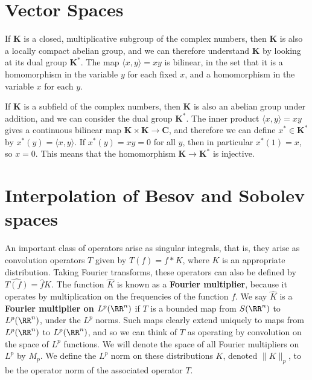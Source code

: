 \chapter{Vector Spaces}

If $\mathbf{K}$ is a closed, multiplicative subgroup of the complex numbers, then $\mathbf{K}$ is also a locally compact abelian group, and we can therefore understand $\mathbf{K}$ by looking at its dual group $\mathbf{K}^*$. The map $\langle x,y \rangle = xy$ is bilinear, in the set that it is a homomorphism in the variable $y$ for each fixed $x$, and a homomorphism in the variable $x$ for each $y$.

If $\mathbf{K}$ is a subfield of the complex numbers, then $\mathbf{K}$ is also an abelian group under addition, and we can consider the dual group $\mathbf{K}^*$. The inner product $\langle x, y \rangle = xy$ gives a continuous bilinear map $\mathbf{K} \times \mathbf{K} \to \mathbf{C}$, and therefore we can define $x^* \in \mathbf{K}^*$ by $x^*(y) = \langle x,y \rangle$. If $x^*(y) = xy = 0$ for all $y$, then in particular $x^*(1) = x$, so $x = 0$. This means that the homomorphism $\mathbf{K} \to \mathbf{K}^*$ is injective.

\chapter{Interpolation of Besov and Sobolev spaces}

An important class of operators arise as singular integrals, that is, they arise as convolution operators $T$ given by $T(f) = f * K$, where $K$ is an appropriate distribution. Taking Fourier transforms, these operators can also be defined by $\widehat{T(f)} = \widehat{f} \widehat{K}$. The function $\widehat{K}$ is known as a {\bf Fourier multiplier}, because it operates by multiplication on the frequencies of the function $f$. We say $\widehat{K}$ is a {\bf Fourier multiplier on $L^p(\RR^n)$} if $T$ is a bounded map from $S(\RR^n)$ to $L^p(\RR^n)$, under the $L^p$ norms. Such maps clearly extend uniquely to maps from $L^p(\RR^n)$ to $L^p(\RR^n)$, and so we can think of $T$ as operating by convolution on the space of $L^p$ functions. We will denote the space of all Fourier multipliers on $L^p$ by $M_p$. We define the $L^p$ norm on these distributions $K$, denoted $\| K \|_p$, to be the operator norm of the associated operator $T$.

